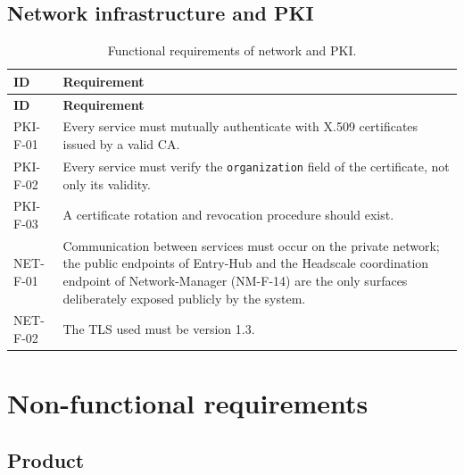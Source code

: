 \subsection{Network infrastructure and PKI}

\begin{longtable}{p{2.6cm} p{\dimexpr\linewidth-2.6cm-4\tabcolsep\relax}}
\caption{Functional requirements of network and PKI.} \\
\hline
\textbf{ID} & \textbf{Requirement} \\
\hline
\endfirsthead
\hline
\textbf{ID} & \textbf{Requirement} \\
\hline
\endhead
\hline
\endfoot
\hline
\endlastfoot
PKI-F-01 & Every service must mutually authenticate with X.509 certificates issued by a valid CA. \\
PKI-F-02 & Every service must verify the \texttt{organization} field of the certificate, not only its validity. \\
PKI-F-03 & A certificate rotation and revocation procedure should exist. \\
NET-F-01 & Communication between services must occur on the private network; the public endpoints of Entry-Hub and the Headscale coordination endpoint of Network-Manager (NM-F-14) are the only surfaces deliberately exposed publicly by the system. \\
NET-F-02 & The TLS used must be version 1.3. \\
\end{longtable}

\section{Non-functional requirements}

\subsection{Product}

